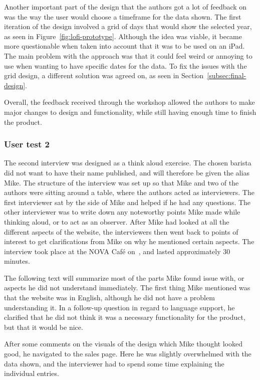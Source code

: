 Another important part of the design that the authors got a lot of feedback on was the way the user would choose a
timeframe for the data shown.
The first iteration of the design involved a grid of days that would show the selected year, as seen in
Figure~\ref{fig:lofi-prototype}.
Although the idea was viable, it became more questionable when taken into account that it was to be used on an iPad.
The main problem with the approach was that it could feel weird or annoying to use when wanting to have specific dates
for the data.
To fix the issues with the grid design, a different solution was agreed on, as seen in
Section~\ref{subsec:final-design}.

Overall, the feedback received through the workshop allowed the authors to make major changes to design and
functionality, while still having enough time to finish the product.

\subsubsection{User test 2}\label{subsubsec:user-test-2}
The second interview was designed as a think aloud exercise.
The chosen barista did not want to have their name published, and will therefore be given the alias Mike.
The structure of the interview was set up so that Mike and two of the authors were sitting around a table,
where the authors acted as interviewers.
The first interviewer sat by the side of Mike and helped if he had any questions.
The other interviewer was to write down any noteworthy points Mike made while thinking aloud,
or to act as an observer.
After Mike had looked at all the different aspects of the website, the interviewers then went back to points of interest
to get clarifications from Mike on why he mentioned certain aspects.
The interview took place at the NOVA Café on~, and lasted approximately 30 minutes.

The following text will summarize most of the parts Mike found issue with, or aspects he did not understand immediately.
The first thing Mike mentioned was that the website was in English, although he did not have a problem understanding it.
In a follow-up question in regard to language support, he clarified that he did not think it was a necessary
functionality for the product, but that it would be nice.

After some comments on the visuals of the design which Mike thought looked good, he navigated to the sales page.
Here he was slightly overwhelmed with the data shown, and the interviewer had to spend some time explaining the
individual entries.

